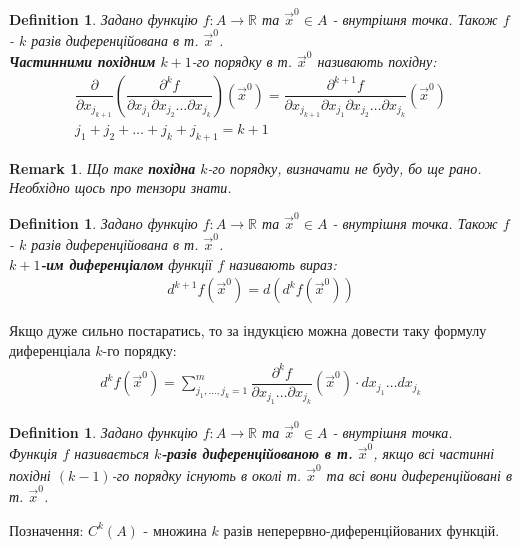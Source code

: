 \documentclass[a4paper, 10pt]{article}
\def\huge{\displaystyle}
\theoremstyle{theoremdd}
\theoremstyle{theoremdd}
\theoremstyle{theoremdd}
\newtheorem{definition}[theorem]{Definition}
\theoremstyle{theoremdd}
\theoremstyle{theoremdd}
\theoremstyle{theoremdd}
\theoremstyle{theoremdd}
\newtheorem{remark}[theorem]{Remark}
\theoremstyle{theoremdd}
\theoremstyle{theoremdd}
\begin{document}
\begin{definition}
Задано функцію $f: A \to \mathbb{R}$ та $\vec{x}^0 \in A$ - внутрішня точка. Також $f$ - $k$ разів диференційована в т. $\vec{x}^0$.\\
\textbf{Частинними похідним} $k+1$-го порядку в т. $\vec{x}^0$ називають похідну:
\begin{align*}
\dfrac{\partial}{\partial x_{j_{k+1}}} \left( \dfrac{\partial^k f}{\partial x_{j_1} \partial x_{j_2} \dots \partial x_{j_k}} \right)(\vec{x}^0) = \dfrac{\partial^{k+1} f}{\partial x_{j_{k+1}} \partial x_{j_1} \partial x_{j_2} \dots \partial x_{j_k}}(\vec{x}^0) \\
j_1+j_2+\dots+j_k+j_{k+1} = k+1
\end{align*}
\end{definition}

\begin{remark}
Що таке \textbf{похідна} $k$-го порядку, визначати не буду, бо ще рано. Необхідно щось про тензори знати.
\end{remark}

\begin{definition}
Задано функцію $f: A \to \mathbb{R}$ та $\vec{x}^0 \in A$ - внутрішня точка. Також $f$ - $k$ разів диференційована в т. $\vec{x}^0$.\\
\textbf{$k+1$-им диференціалом} функції $f$ називають вираз:
\begin{align*}
d^{k+1}f(\vec{x}^0) = d(d^k f(\vec{x}^0))
\end{align*}
\end{definition}
Якщо дуже сильно постаратись, то за індукцією можна довести таку формулу диференціала $k$-го порядку:
\begin{align*}
d^{k} f(\vec{x}^0) = \huge\sum_{j_1,\dots,j_k=1}^m \dfrac{\partial^k f}{\partial x_{j_1}\dots \partial x_{j_k}} (\vec{x}^0) \cdot dx_{j_1} \dots dx_{j_k}
\end{align*}

\begin{definition}
Задано функцію $f: A \to \mathbb{R}$ та $\vec{x}^0 \in A$ - внутрішня точка.\\
Функція $f$ називається \textbf{$k$-разів диференційованою в т.} $\vec{x}^0$, якщо всі частинні похідні $(k-1)$-го порядку існують в околі т. $\vec{x}^0$ та всі вони диференційовані в т. $\vec{x}^0$.
\end{definition}

Позначення: $C^k(A)$ - множина $k$ разів неперервно-диференційованих функцій.
\end{document}
